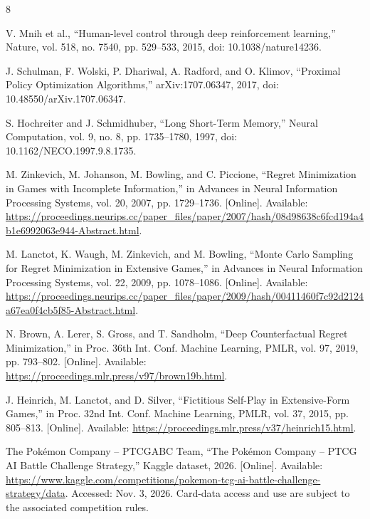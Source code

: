 \documentclass[11pt]{article}
\begin{document}
\begin{thebibliography}{8}

 V. Mnih et al., ``Human-level control through deep reinforcement learning,'' Nature, vol. 518, no. 7540, pp. 529--533, 2015, doi: 10.1038/nature14236.

 J. Schulman, F. Wolski, P. Dhariwal, A. Radford, and O. Klimov, ``Proximal Policy Optimization Algorithms,'' arXiv:1707.06347, 2017, doi: 10.48550/arXiv.1707.06347.

 S. Hochreiter and J. Schmidhuber, ``Long Short-Term Memory,'' Neural Computation, vol. 9, no. 8, pp. 1735--1780, 1997, doi: 10.1162/NECO.1997.9.8.1735.

 M. Zinkevich, M. Johanson, M. Bowling, and C. Piccione, ``Regret Minimization in Games with Incomplete Information,'' in Advances in Neural Information Processing Systems, vol. 20, 2007, pp. 1729--1736. [Online]. Available: \url{https://proceedings.neurips.cc/paper_files/paper/2007/hash/08d98638c6fcd194a4b1e6992063e944-Abstract.html}.

 M. Lanctot, K. Waugh, M. Zinkevich, and M. Bowling, ``Monte Carlo Sampling for Regret Minimization in Extensive Games,'' in Advances in Neural Information Processing Systems, vol. 22, 2009, pp. 1078--1086. [Online]. Available: \url{https://proceedings.neurips.cc/paper_files/paper/2009/hash/00411460f7c92d2124a67ea0f4cb5f85-Abstract.html}.

 N. Brown, A. Lerer, S. Gross, and T. Sandholm, ``Deep Counterfactual Regret Minimization,'' in Proc. 36th Int. Conf. Machine Learning, PMLR, vol. 97, 2019, pp. 793--802. [Online]. Available: \url{https://proceedings.mlr.press/v97/brown19b.html}.

 J. Heinrich, M. Lanctot, and D. Silver, ``Fictitious Self-Play in Extensive-Form Games,'' in Proc. 32nd Int. Conf. Machine Learning, PMLR, vol. 37, 2015, pp. 805--813. [Online]. Available: \url{https://proceedings.mlr.press/v37/heinrich15.html}.

 The Pok\'emon Company -- PTCGABC Team, ``The Pok\'emon Company -- PTCG AI Battle Challenge Strategy,'' Kaggle dataset, 2026. [Online]. Available: \url{https://www.kaggle.com/competitions/pokemon-tcg-ai-battle-challenge-strategy/data}. Accessed: Nov. 3, 2026. Card-data access and use are subject to the associated competition rules.

\end{thebibliography}
\end{document}
